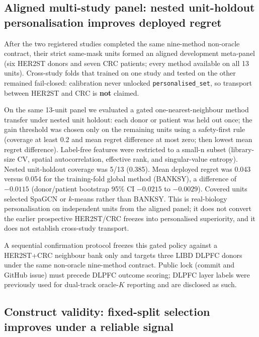 \documentclass[12pt]{article}
\begin{document}
\subsection{Aligned multi-study panel: nested unit-holdout personalisation improves
deployed regret}

After the two registered studies completed the same nine-method non-oracle
contract, their strict same-mask units formed an aligned development
meta-panel (six HER2ST donors and seven CRC patients; every method available
on all 13 units). Cross-study folds that trained on one study and tested on
the other remained fail-closed: calibration never unlocked
\texttt{personalised\_set}, so transport between HER2ST and CRC is
\textbf{not} claimed.

On the same 13-unit panel we evaluated a gated one-nearest-neighbour method
transfer under nested unit holdout: each donor or patient was held out once;
the gain threshold was chosen only on the remaining units using a
safety-first rule (coverage at least 0.2 and mean regret difference at most
zero; then lowest mean regret difference). Label-free features were restricted
to a small-n subset (library-size CV, spatial autocorrelation, effective rank,
and singular-value entropy). Nested unit-holdout coverage was 5/13 (0.385).
Mean deployed regret was 0.043 versus 0.054 for the training-fold global
method (BANKSY), a difference of \(-0.0115\) (donor/patient bootstrap 95\% CI
\(-0.0215\) to \(-0.0029\)). Covered units selected SpaGCN or \(k\)-means
rather than BANKSY. This is real-biology personalisation on independent units
from the aligned panel; it does not convert the earlier prospective
HER2ST/CRC freezes into personalised superiority, and it does not establish
cross-study transport.

A sequential confirmation protocol freezes this gated policy against a
HER2ST+CRC neighbour bank only and targets three LIBD DLPFC donors under the
same non-oracle nine-method contract. Public lock (commit and GitHub issue)
must precede DLPFC outcome scoring; DLPFC layer labels were previously used
for dual-track oracle-\(K\) reporting and are disclosed as such.

\subsection{Construct validity: fixed-split selection improves under a reliable signal}
\end{document}
